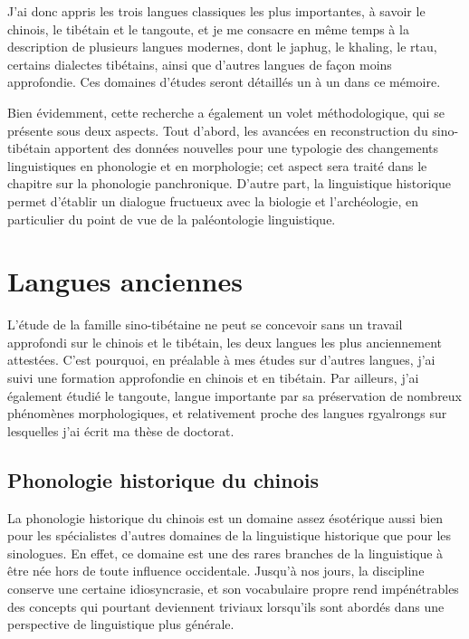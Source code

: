 \documentclass[oldfontcommands,oneside,a4paper,11pt]{memoir}
\begin{document}
J'ai donc appris les trois langues classiques les plus importantes, à savoir le chinois, le tibétain et le tangoute, et je me consacre en même temps à la description de plusieurs langues modernes, dont le japhug, le khaling, le rtau, certains dialectes tibétains, ainsi que d'autres langues de façon moins approfondie. Ces domaines d'études seront détaillés un à un dans ce mémoire.

Bien évidemment, cette recherche a également un volet méthodologique, qui se présente sous deux aspects. Tout d'abord, les avancées en reconstruction du sino-tibétain apportent des données nouvelles pour une typologie des changements linguistiques en phonologie et en morphologie; cet aspect sera traité dans le chapitre sur la phonologie panchronique. D'autre part, la linguistique historique permet d'établir un dialogue fructueux avec la biologie et l'archéologie, en particulier du point de vue de la paléontologie linguistique. 


\chapter{Langues anciennes}
L’étude de la famille sino-tibétaine ne peut se concevoir sans un travail approfondi sur le chinois et le tibétain, les deux langues les plus anciennement attestées. C’est pourquoi, en préalable à mes études sur d’autres langues, j’ai suivi une formation approfondie en chinois et en tibétain.  Par ailleurs, j'ai également étudié le tangoute, langue importante par sa préservation de nombreux phénomènes morphologiques, et relativement proche des langues rgyalrongs sur lesquelles j'ai écrit ma thèse de doctorat.

\section{Phonologie historique du chinois}
La phonologie historique du chinois est un domaine assez ésotérique aussi bien pour les spécialistes d'autres domaines de la linguistique historique que pour les sinologues. En effet, ce domaine est une des rares branches de la linguistique à être née hors de toute influence occidentale. Jusqu'à nos jours, la discipline conserve une certaine idiosyncrasie, et son vocabulaire propre rend impénétrables des concepts qui pourtant deviennent triviaux lorsqu'ils sont abordés dans une perspective de linguistique plus générale. 
\end{document}
